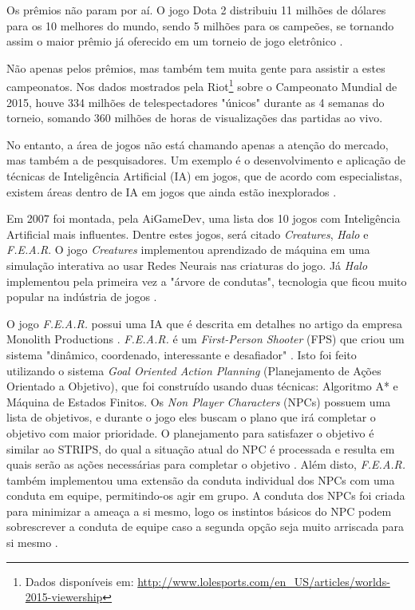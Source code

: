 \documentclass[
	12pt,					%
	openright,				%
	oneside,				%
	a4paper,				%
	bibjustif,				%
	chapter=TITLE,			%
	english,				%
	brazil,					%
	]{abntex2}
\begin{document}
	Os prêmios não param por aí.
	O jogo Dota 2 distribuiu 11 milhões de dólares para os 10 melhores do mundo,
	sendo 5 milhões para os campeões,
	se tornando assim o maior prêmio já oferecido em um torneio de jogo eletrônico \cite{nytimes}.
	
	Não apenas pelos prêmios, mas também tem muita gente para assistir a estes campeonatos.
	Nos dados mostrados pela Riot\footnote{Dados disponíveis em: \url{http://www.lolesports.com/en_US/articles/worlds-2015-viewership}}
	sobre o Campeonato Mundial de 2015,
	houve 334 milhões de telespectadores "únicos"{} durante as 4 semanas do torneio,
	somando 360 milhões de horas de visualizações das partidas ao vivo.
	
	No entanto, a área de jogos não está chamando apenas a atenção do mercado,
	mas também a de pesquisadores.
	Um exemplo é o desenvolvimento e aplicação de técnicas de Inteligência Artificial (IA) em jogos,
	que de acordo com especialistas,
	existem áreas dentro de IA em jogos que ainda estão inexplorados \cite{panoramaAI}.
	
	Em 2007 foi montada, pela AiGameDev, uma lista dos 10 jogos com Inteligência Artificial mais influentes.
	Dentre estes jogos, será citado \textit{Creatures}, \textit{Halo} e \textit{F.E.A.R}.
	O jogo \textit{Creatures} implementou aprendizado de máquina em uma simulação interativa
	ao usar Redes Neurais nas criaturas do jogo.
	Já \textit{Halo} implementou pela primeira vez a "árvore de condutas"{},
	tecnologia que ficou muito popular na indústria de jogos \cite{aigamedev}.
	
	O jogo \textit{F.E.A.R.} possui uma IA que é descrita em detalhes no artigo da empresa Monolith Productions \cite{fear}.
	\textit{F.E.A.R.} é um \textit{First-Person Shooter} (FPS) que criou um sistema "dinâmico, coordenado, interessante e desafiador"{} \cite{fear}.
	Isto foi feito utilizando o sistema \textit{Goal Oriented Action Planning} (Planejamento de Ações Orientado a Objetivo),
	que foi construído usando duas técnicas: Algoritmo A* e Máquina de Estados Finitos.
	Os \textit{Non Player Characters} (NPCs) possuem uma lista de objetivos,
	e durante o jogo eles buscam o plano que irá completar o objetivo com maior prioridade.
	O planejamento para satisfazer o objetivo é similar ao STRIPS,
	do qual a situação atual do NPC é processada e resulta em quais serão as ações necessárias para completar o objetivo \cite{fear}.
	Além disto, \textit{F.E.A.R.} também implementou uma extensão da conduta individual dos NPCs
	com uma conduta em equipe,
	permitindo-os agir em grupo.
	A conduta dos NPCs foi criada para minimizar a ameaça a si mesmo,
	logo os instintos básicos do NPC podem sobrescrever a conduta de equipe
	caso a segunda opção seja muito arriscada para si mesmo \cite{fear}.
	
\end{document}
